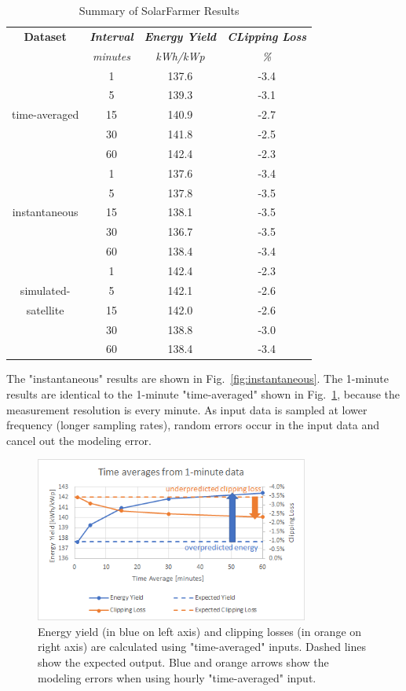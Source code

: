 \documentclass[conference]{IEEEtran}
\begin{document}
\begin{table}[htbp]
\caption{Summary of SolarFarmer Results}
\begin{center}
\begin{tabular}{|c|c|c|c|}
\hline
\textbf{Dataset} & \textbf{\textit{Interval}}& \textbf{\textit{Energy Yield}}& \textbf{\textit{CLipping Loss}} \\
                 & \textit{minutes}& \textit{kWh/kWp}& \textit{\%} \\
\hline
             &  1& 137.6& -3.4 \\
             &  5& 139.3& -3.1 \\
time-averaged& 15& 140.9& -2.7 \\
             & 30& 141.8& -2.5 \\
             & 60& 142.4& -2.3 \\

\hline
             &  1& 137.6& -3.4 \\
             &  5& 137.8& -3.5 \\
instantaneous& 15& 138.1& -3.5 \\
             & 30& 136.7& -3.5 \\
             & 60& 138.4& -3.4 \\
\hline
             &  1& 142.4& -2.3 \\
simulated-   &  5& 142.1& -2.6 \\
satellite    & 15& 142.0& -2.6 \\
             & 30& 138.8& -3.0 \\
             & 60& 138.4& -3.4 \\
\hline
\end{tabular}
\label{table:results-summary}
\end{center}
\end{table}

The "instantaneous" results are shown in Fig.~\ref{fig:instantaneous}. The 1-minute results are identical to the 1-minute "time-averaged" shown in Fig.~\ref{fig:time-averaged}, because the measurement resolution is every minute. As input data is sampled at lower frequency (longer sampling rates), random errors occur in the input data and cancel out the modeling error.

\begin{figure}[htbp]
\centerline{\includegraphics[width=9cm]{time-averaged.png}}
\caption{Energy yield (in blue on left axis) and clipping losses (in orange on right axis) are calculated using "time-averaged" inputs. Dashed lines show the expected output. Blue and orange arrows show the modeling errors when using hourly "time-averaged" input.}
\label{fig:time-averaged}
\end{figure}
\end{document}
